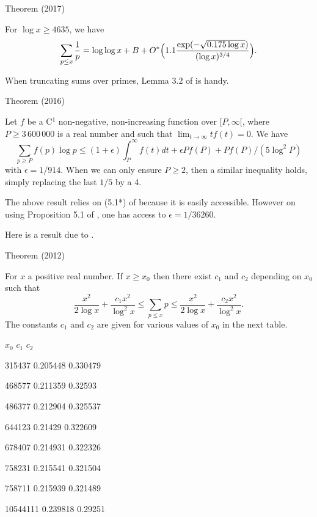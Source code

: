 \par 
\begin{thm}{Theorem (2017)}

  For $\log x\ge 4635$, we have
  $$
  \sum_{p\le x}\frac1p=\log\log
  x+B+O^*\Bigl(1.1\frac{\exp(-\sqrt{0.175\log x})}{(\log x)^{3/4}}\Bigr).
  $$
\end{thm}






\par 
When truncating sums over primes, Lemma 3.2 of
\cite{Ramare*13d}
is handy.
\par 
\begin{thm}{Theorem (2016)}

  Let $f$ be a C${}^1$ non-negative, non-increasing function over
  $[P,\infty[$, where $P\ge 3\,600\,000$ is a real number and such
  that $\lim_{t\rightarrow\infty}tf(t)=0$. 
  We have
  \begin{equation*}
    \sum_{p\ge P} f(p)\log p
    \le (1+\epsilon) \int_P^\infty f(t) dt  +  \epsilon P f(P)  +  P
  f(P) / (5 \log^2 P) 
  \end{equation*}
  with $\epsilon=1/914$. When we can only ensure $P\ge2$, then a similar
  inequality holds, simply replacing the last $1/5$ by a 4.
\end{thm}


The above result  relies on (5.1*) of
\cite{Schoenfeld*76}
because it is easily accessible. However on using
Proposition 5.1 of
\cite{Dusart*07},
one has access to $\epsilon=1/36260$.

\par 
  \par 
Here is a result due to 
\cite{Trevino*12}.
\par 
\begin{thm}{Theorem (2012)}

For $x$ a positive real number. If $x \geq x_0$ then there exist $c_1$
and $c_2$ depending on $x_0$ such that
$$
\frac{x^2}{2\log{x}} +
\frac{c_1 x^2}{\log^2{x}} \leq \sum_{p \leq x} p \leq
\frac{x^2}{2\log{x}} + \frac{c_2 x^2}{\log^2{x}}.
$$
The constants
$c_1$ and $c_2$ are given for various values of $x_0$ in the next
table.

  
  
    
      $x_0$
      $c_1$
      $c_2$
    
  
  
    315437
    0.205448
    0.330479
  
  
    468577
    0.211359
    0.32593
  
  
    486377
    0.212904
    0.325537
  
  
    644123
    0.21429
    0.322609
  
  
    678407
    0.214931
    0.322326
  
  
    758231
    0.215541
    0.321504
  
  
    758711
    0.215939
    0.321489
  
  
    10544111
    0.239818
    0.29251
  
  

\end{thm}

